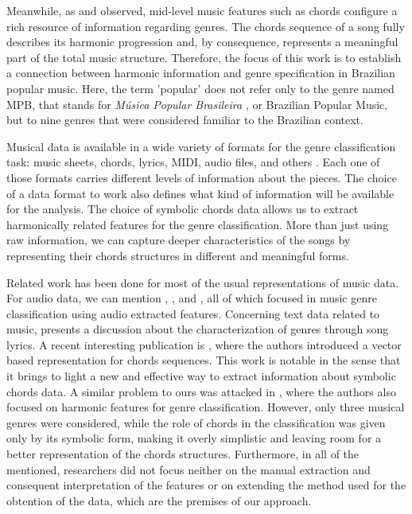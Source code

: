 \documentclass[twocolumn]{article}
\begin{document}
Meanwhile, as \cite{Cheng2008} 
and \cite{Correa2016}
observed, mid-level
music features such as chords configure a rich
resource of information regarding genres. The
chords sequence of a song fully describes its
harmonic progression and, by consequence, represents
a meaningful part of the total music structure.  
Therefore, the focus of this work is to establish
a connection between harmonic information 
and genre specification in Brazilian popular music. 
Here, the term 'popular' does not refer only to 
the genre named MPB, that stands for 
\textit{Música Popular Brasileira}
\cite{albin2003livro}, or
Brazilian Popular Music, but to nine 
genres that were considered familiar to the
Brazilian context. 


Musical data is available in a wide variety of formats
for the genre classification task: music sheets, 
chords, lyrics, MIDI, audio files, and 
others \cite{Burgoyne2015}. Each one of those 
formats carries different levels of information 
about the pieces. The choice of a data format to 
work also defines what kind of information will 
be available for the analysis. The 
choice of symbolic chords data allows
us to extract harmonically related features
for the genre classification. More than
just using raw information, we can capture deeper
characteristics of the songs by 
representing their chords structures in
different and meaningful forms. 

Related work has been done for most of the usual
representations of music data. For audio data,
we can mention \cite{Pampalk}, 
\cite{Tzanetakis}, 
\cite{Bahuleyan} and 
\cite{Scaringella}, all of which focused
in music genre classification using
audio extracted features. Concerning
text data related to music,
\cite{Neuman2016} presents a discussion
about the characterization of genres
through song lyrics. A recent interesting publication is \cite{Chuan2018}, where 
the authors introduced a vector 
based representation for chords sequences.
This work is notable in the sense that it
brings to light a new and effective way
to extract information about symbolic 
chords data. A similar problem to ours was attacked in \cite{PerezSancho2010},
where the authors also focused on harmonic features for genre classification. 
However, only three musical genres were considered,
while the role of chords in the classification 
was given only by its symbolic form, 
making it overly simplistic and leaving room
for a better representation of the
chords structures. Furthermore,  in all of the 
mentioned, researchers did not focus
neither on the manual extraction
and consequent interpretation 
of the features or on extending the method
used for the obtention of the data, which
are the premises of our approach. 
\end{document}
